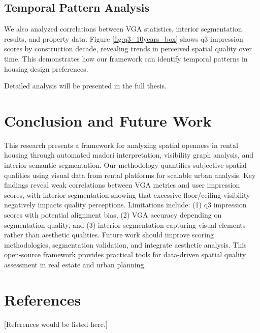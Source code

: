 \documentclass[11pt,a4paper]{article}
\begin{document}
\begin{multicols}{2}
\subsection{Temporal Pattern Analysis}
We also analyzed correlations between VGA statistics, interior segmentation results, and property data.
Figure \ref{fig:q3_10years_box} shows q3 impression scores by construction decade, revealing trends in 
perceived spatial quality over time. This demonstrates how our framework can identify temporal patterns 
in housing design preferences.







Detailed analysis will be presented in the full thesis.



\section{Conclusion and Future Work}

This research presents a framework for analyzing spatial openness in rental housing through automated madori
interpretation, visibility graph analysis, and interior semantic segmentation. Our methodology quantifies subjective 
spatial qualities using visual data from rental platforms for scalable urban analysis. Key findings reveal weak 
correlations between VGA metrics and user impression scores, with interior segmentation showing that excessive 
floor/ceiling visibility negatively impacts quality perceptions. Limitations include: (1) q3 impression scores 
with potential alignment bias, (2) VGA accuracy depending on segmentation quality, and (3) interior segmentation 
capturing visual elements rather than aesthetic qualities. Future work should improve scoring methodologies, 
segmentation validation, and integrate aesthetic analysis. This open-source framework provides practical tools 
for data-driven spatial quality assessment in real estate and urban planning.

\section{References}

[References would be listed here.]

\end{multicols}
\end{document}
